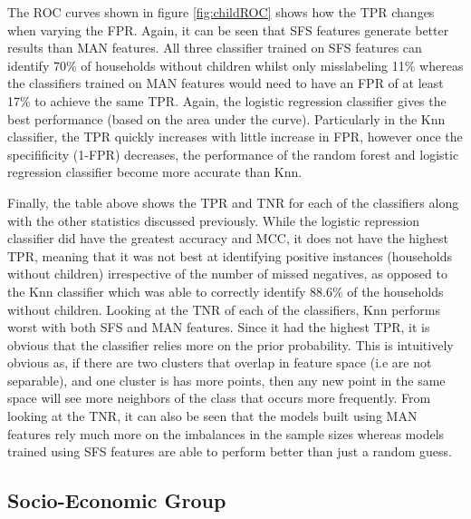 \childROC
The ROC curves shown in figure \ref{fig:childROC} shows how the TPR changes when varying the FPR. Again, it can be seen that SFS features generate better results than MAN features. All three classifier trained on SFS features can identify 70\% of households without children whilst only misslabeling 11\% whereas the classifiers trained on MAN features would need to have an FPR of at least 17\% to achieve the same TPR. Again, the logistic regression classifier gives the best performance (based on the area under the curve). Particularly in the Knn classifier, the TPR quickly increases with little increase in FPR, however once the specifificity (1-FPR) decreases, the performance of the random forest and logistic regression classifier become more accurate than Knn.
\childResults

Finally, the table above shows the TPR and TNR for each of the classifiers along with the other statistics discussed previously. While the logistic repression classifier did have the greatest accuracy and MCC, it does not have the highest TPR, meaning that it was not best at identifying positive instances (households without children) irrespective of the number of missed negatives, as opposed to the Knn classifier which was able to correctly identify 88.6\% of the households without children. Looking at the TNR of each of the classifiers, Knn performs worst with both SFS and MAN features. Since it had the highest TPR, it is obvious that the classifier relies more on the prior probability. This is intuitively obvious as, if there are two clusters that overlap in feature space (i.e are not separable), and one cluster is has more points, then any new point in the same space will see more neighbors of the class that occurs more frequently. From looking at the TNR, it can also be seen that the models built using MAN features rely much more on the imbalances in the sample sizes whereas models trained using SFS features are able to perform better than just a random guess. 

\subsection{Socio-Economic Group}


